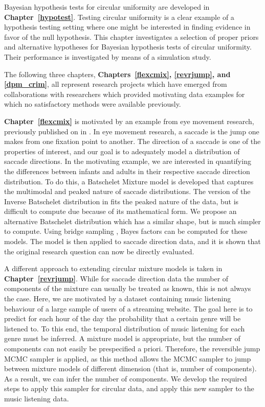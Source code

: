 \documentclass[12pt, a4paper]{book}\usepackage[]{graphicx}\usepackage[]{color}
\begin{document}
Bayesian hypothesis tests for circular uniformity are developed in \textbf{Chapter~\ref{hypotest}}. Testing circular uniformity is a clear example of a hypothesis testing setting where one might be interested in finding evidence in favor of the null hypothesis. This chapter investigates a selection of proper priors and alternative hypotheses for Bayesian hypothesis tests of circular uniformity. Their performance is investigated by means of a simulation study.

The following three chapters, \textbf{Chapters~\ref{flexcmix}, \ref{revrjump}, and \ref{dpm_crim}}, all represent research projects which have emerged from collaborations with researchers which provided motivating data examples for which no satisfactory methods were available previously.

\textbf{Chapter~\ref{flexcmix}} is motivated by an example from eye movement research, previously published on in \citet{van2016infants}. In eye movement research, a saccade is the jump one makes from one fixation point to another. The direction of a saccade is one of the properties of interest, and our goal is to adequately model a distribution of saccade directions. In the motivating example, we are interested in quantifying the differences between infants and adults in their respective saccade direction distribution. To do this, a Batschelet Mixture model is developed that captures the multimodal and peaked nature of saccade distributions. The version of the Inverse Batschelet distribution in \citet{jones2012inverse} fits the peaked nature of the data, but is difficult to compute due because of its mathematical form. We propose an alternative Batschelet distribution which has a similar shape, but is much simpler to compute. Using bridge sampling \citep{meng1996simulating, gronau2017tutorial}, Bayes factors can be computed for these models. The model is then applied to saccade direction data, and it is shown that the original research question can now be directly evaluated.

A different approach to extending circular mixture models is taken in \textbf{Chapter~\ref{revrjump}}. While for saccade direction data the number of components of the mixture can usually be treated as known, this is not always the case. Here, we are motivated by a dataset containing music listening behaviour of a large sample of users of a streaming website. The goal here is to predict for each hour of the day the probability that a certain genre will be listened to. To this end, the temporal distribution of music listening for each genre must be inferred. A mixture model is appropriate, but the number of components can not easily be prespecified a priori. Therefore, the reversible jump MCMC sampler \citep{richardson1997bayesian} is applied, as this method allows the MCMC sampler to jump between mixture models of different dimension (that is, number of components). As a result, we can infer the number of components. We develop the required steps to apply this sampler for circular data, and apply this new sampler to the music listening data.
\end{document}
